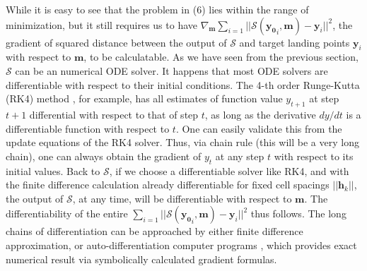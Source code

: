 \documentclass[conference]{IEEEtran}
\begin{document}
While it is easy to see that the problem in (6) lies within the range 
of minimization, but it still requires us to have 
$\nabla_{\mathbf{m}}
\sum_{i=1}|| \mathcal{S}(\mathbf{y_0}_i, \mathbf{m}) - \mathbf{y}_i||^2$, 
the gradient of squared distance between the output of $\mathcal{S}$ and 
target landing points $\mathbf{y}_i$ with respect to $\mathbf{m}$, to be 
calculatable. As we have seen from the previous section, $\mathcal{S}$ 
can be an numerical ODE solver. It happens that most ODE solvers are differentiable 
with respect to their initial conditions. The 4-th order Runge-Kutta (RK4) method \cite{RK4}, 
for example, has all estimates of function value $y_{t+1}$ at step $t+1$ 
differential with respect to that of step $t$, as long as the derivative 
$dy/dt$ is a differentiable function with respect to $t$. One can 
easily validate this from the update equations of the RK4 solver. Thus, via 
chain rule (this will be a very long chain), one can always obtain the 
gradient of $y_{t}$ at any step $t$ with respect to its initial values. 
Back to $\mathcal{S}$, if we choose a differentiable solver like RK4, and 
with the finite difference calculation already differentiable for fixed cell 
spacings $||\mathbf{h}_k||$, the output of $\mathcal{S}$, at any time, will
be differentiable with respect to $\mathbf{m}$. The differentiability 
of the entire 
$\sum_{i=1}|| \mathcal{S}(\mathbf{y_0}_i, \mathbf{m}) - \mathbf{y}_i||^2$
thus follows. The long chains of differentiation can be approached by either  
finite difference approximation, or auto-differentiation computer 
programs \cite{torch}, which provides exact numerical result via symbolically calculated 
gradient formulas. 
\end{document}
